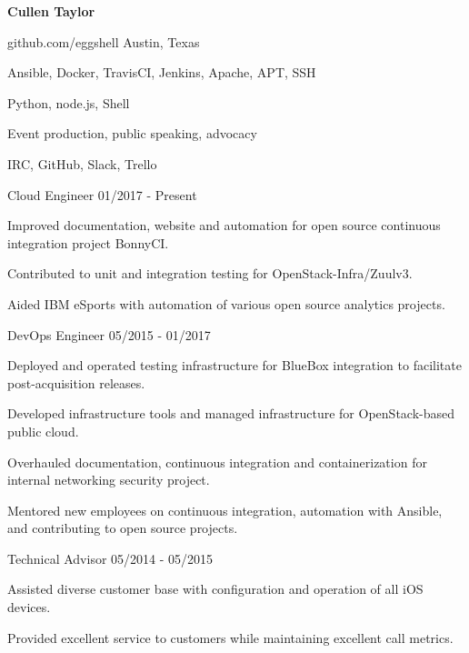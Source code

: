 \documentclass[12pt]{article} %
\begin{document}
\centerline{{\Huge \bf Cullen Taylor}}
\bigskip

        {github.com/eggshell}
        {Austin, Texas}
        {}


      {Ansible, Docker, TravisCI, Jenkins, Apache, APT, SSH}

      {Python, node.js, Shell}

      {Event production, public speaking, advocacy}

      {IRC, GitHub, Slack, Trello}


\begin{description}
{}
           {Cloud Engineer}
           {01/2017 - Present}

Improved documentation, website and automation for open source continuous
integration project BonnyCI.

Contributed to unit and integration testing for OpenStack-Infra/Zuulv3.

Aided IBM eSports with automation of various open source analytics
projects.

           {DevOps Engineer}
           {05/2015 - 01/2017}

Deployed and operated testing infrastructure for BlueBox integration to
facilitate post-acquisition releases.

Developed infrastructure tools and managed infrastructure for OpenStack-based
public cloud.

Overhauled documentation, continuous integration and containerization for
internal networking security project.

Mentored new employees on continuous integration, automation with Ansible,
and contributing to open source projects.

           {Technical Advisor}
           {05/2014 - 05/2015}

Assisted diverse customer base with configuration and operation of all iOS
devices.

Provided excellent service to customers while maintaining excellent call
metrics.

\end{description}
\end{document}
